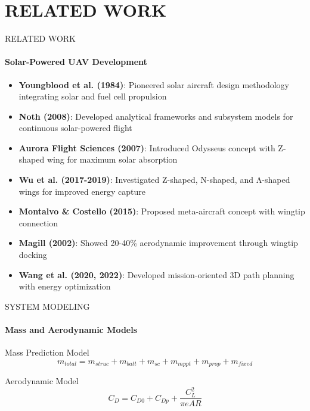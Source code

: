 \documentclass{beamer}
\begin{document}
	
	\section{RELATED WORK}
\begin{frame}{RELATED WORK}
    \framesubtitle{Solar-Powered UAV Development}
    \begin{itemize}
        \item \textbf{Youngblood et al. (1984)}: Pioneered solar aircraft design methodology integrating solar and fuel cell propulsion
        \item \textbf{Noth (2008)}: Developed analytical frameworks and subsystem models for continuous solar-powered flight
        \item \textbf{Aurora Flight Sciences (2007)}: Introduced Odysseus concept with Z-shaped wing for maximum solar absorption
        \item \textbf{Wu et al. (2017-2019)}: Investigated Z-shaped, N-shaped, and Λ-shaped wings for improved energy capture
        \item \textbf{Montalvo \& Costello (2015)}: Proposed meta-aircraft concept with wingtip connection
        \item \textbf{Magill (2002)}: Showed 20-40\% aerodynamic improvement through wingtip docking
        \item \textbf{Wang et al. (2020, 2022)}: Developed mission-oriented 3D path planning with energy optimization
    \end{itemize}
\end{frame}

\begin{frame}{SYSTEM MODELING}
    \framesubtitle{Mass and Aerodynamic Models}
    
    \begin{block}{Mass Prediction Model}
    \begin{equation*}
        m_{total} = m_{struc} + m_{batt} + m_{sc} + m_{mppt} + m_{prop} + m_{fixed}
    \end{equation*}
    \end{block}
    
    \begin{block}{Aerodynamic Model}
    \begin{equation*}
        C_D = C_{D0} + C_{Dp} + \frac{C_L^2}{\pi eAR}
    \end{equation*}
    \end{block}
\end{frame}
\end{document}
